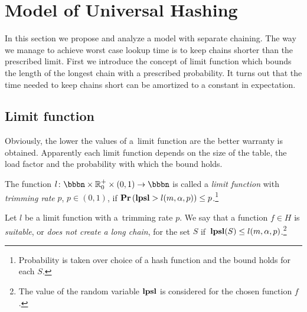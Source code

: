 \section{Model of Universal Hashing}
\label{section-model}
In this section we propose and analyze a model with separate chaining. 
The way we manage to achieve worst case lookup time is to keep chains shorter than the prescribed limit. 
First we introduce the concept of limit function which bounds the length of the longest chain with a prescribed probability. 
It turns out that the time needed to keep chains short can be amortized to a constant in expectation.

\subsection{Limit function}
Obviously, the lower the values of a~limit function are the better warranty is obtained. 
Apparently each limit function depends on the size of the table, the load factor and the probability with which the bound holds.

\begin{definition}
\label{definition-limit-function}
The function $l\colon \bbbn \times \mathbb{R}_0^+ \times (0, 1) \rightarrow \bbbn$ is called a \emph{limit function} with \emph{trimming rate} $p$, $p \in (0, 1)$, if $\mathbf{Pr}\left(\mathbf{lpsl} > l(m, \alpha, p)\right) \leq p$.\footnote{Probability is taken over choice of a hash function and the bound holds for each $S$.}

Let $l$ be a limit function with a~trimming rate $p$.
We say that a function $f \in H$ is \emph{suitable}, or \emph{does not create a long chain}, for the set $S$ if $\,\mathbf{lpsl}(S) \le l(m, \alpha, p)$.\footnote{The value of the random variable $\mathbf{lpsl}$ is considered for the chosen function $f$.}
\end{definition}

